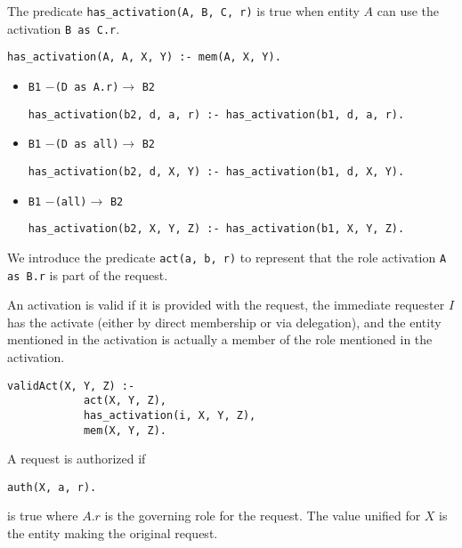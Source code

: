 \documentclass{article}
\newcommand{\predicate}[1]{\texttt{#1}}
\newcommand{\delcert}[3]{\texttt{#1} $-$\texttt{(#2)}$\rightarrow$ \texttt{#3}}
\newcommand{\activate}[2]{\texttt{#1 as #2}}
\begin{document}
The predicate \predicate{has\_activation(A, B, C, r)} is true when
entity $A$ can use the activation \activate{B}{C.r}.

\texttt{has\_activation(A, A, X, Y) :- mem(A, X, Y).}

\begin{itemize}

\item \delcert{B1}{D as A.r}{B2}

\texttt{has\_activation(b2, d, a, r) :- has\_activation(b1, d, a, r).}

\item \delcert{B1}{D as all}{B2}

\texttt{has\_activation(b2, d, X, Y) :- has\_activation(b1, d, X, Y).}

\item \delcert{B1}{all}{B2}

\texttt{has\_activation(b2, X, Y, Z) :- has\_activation(b1, X, Y, Z).}

\end{itemize}

We introduce the predicate \predicate{act(a, b, r)} to represent that
the role activation \activate{A}{B.r} is part of the request.

An activation is valid if it is provided with the request, the immediate
requester $I$ has the activate (either by direct membership or via
delegation), and the entity mentioned in the activation is actually a
member of the role mentioned in the activation.

\begin{verbatim}
validAct(X, Y, Z) :-
            act(X, Y, Z),
            has_activation(i, X, Y, Z),
            mem(X, Y, Z).
\end{verbatim}

A request is authorized if

\texttt{auth(X, a, r).}

is true where $A.r$ is the governing role for the request. The value
unified for $X$ is the entity making the original request.
\end{document}
